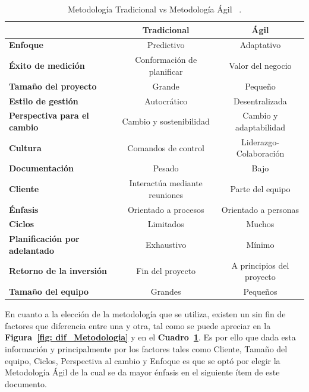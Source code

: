 \begin{table}[htb]
    
    \caption{\label{tab: tab_dif_Metodologia} Metodología Tradicional vs Metodología Ágil ~\cite{5}. }
    \footnotesize
    \begin{tabular}{| l || c | c |}
    
    \hline
      & \textbf{Tradicional} & \textbf{Ágil} \\
    
    \hline\hline
    
    \textbf{Enfoque} & Predictivo & Adaptativo\\ \hline

    \textbf{Éxito de medición}   & Conformación de planificar & Valor del negocio\\ \hline

    \textbf{Tamaño del proyecto} & Grande & Pequeño\\ \hline

    \textbf{Estilo de gestión} & Autocrático & Desentralizada \\ \hline

    \textbf{Perspectiva para el cambio} & Cambio y sostenibilidad & Cambio y adaptabilidad\\ \hline

    \textbf{Cultura} & Comandos de control & Liderazgo-Colaboración\\ \hline

    \textbf{Documentación} & Pesado & Bajo\\ \hline

    \textbf{Cliente} & Interactúa mediante reuniones & Parte del equipo\\ \hline

    \textbf{Énfasis} & Orientado a procesos & Orientado a personas\\ \hline
    
    \textbf{Ciclos} & Limitados & Muchos\\ \hline
    
    \textbf{Planificación por adelantado} & Exhaustivo & Mínimo\\ \hline
    
    \textbf{Retorno de la inversión} & Fin del proyecto & A principios del proyecto\\ \hline

    \textbf{Tamaño del equipo} & Grandes & Pequeños\\ \hline
    \end{tabular}  
\end{table}

En cuanto a la elección de la metodología que se utiliza, existen un sin fin de factores que diferencia entre una y otra, tal como se puede apreciar en la \textbf{Figura~\ref{fig: dif_Metodologia}}  y en el \textbf{Cuadro~\ref{tab: tab_dif_Metodologia}}. Es por ello que dada esta información y principalmente por los factores tales como Cliente, Tamaño del equipo, Ciclos, Perspectiva al cambio y Enfoque es que se optó por elegir la Metodología Ágil de la cual se da mayor énfasis en el siguiente ítem de este documento.






